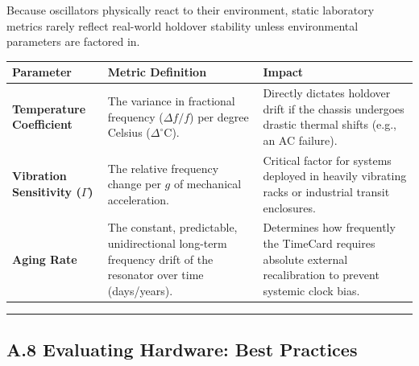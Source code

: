 Because oscillators physically react to their environment, static
laboratory metrics rarely reflect real-world holdover stability unless
environmental parameters are factored in.

{\def\LTcaptype{none} %
\begin{longtable}[]{@{}
  >{\raggedright\arraybackslash}p{}
  >{\raggedright\arraybackslash}p{}
  >{\raggedright\arraybackslash}p{}@{}}
\toprule\noalign{}
\begin{minipage}[b]{\linewidth}\raggedright
Parameter
\end{minipage} & \begin{minipage}[b]{\linewidth}\raggedright
Metric Definition
\end{minipage} & \begin{minipage}[b]{\linewidth}\raggedright
Impact
\end{minipage} \\
\midrule\noalign{}
\endhead
\bottomrule\noalign{}
\endlastfoot
\textbf{Temperature Coefficient} & The variance in fractional frequency
(\(\Delta f/f\)) per degree Celsius (\(\Delta^\circ\text{C}\)). &
Directly dictates holdover drift if the chassis undergoes drastic
thermal shifts (e.g., an AC failure). \\
\textbf{Vibration Sensitivity (\(\Gamma\))} & The relative frequency
change per \(g\) of mechanical acceleration. & Critical factor for
systems deployed in heavily vibrating racks or industrial transit
enclosures. \\
\textbf{Aging Rate} & The constant, predictable, unidirectional
long-term frequency drift of the resonator over time (days/years). &
Determines how frequently the TimeCard requires absolute external
recalibration to prevent systemic clock bias. \\
\end{longtable}
}

\begin{center}\rule{0.5\linewidth}{0.5pt}\end{center}

\subsection{A.8 Evaluating Hardware: Best
Practices}\label{a.8-evaluating-hardware-best-practices}

